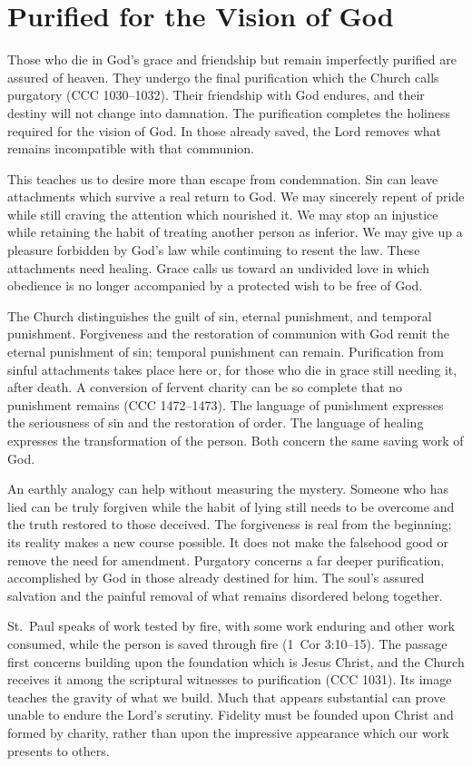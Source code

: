 \section{Purified for the Vision of God}

Those who die in God's grace and friendship but remain imperfectly purified are assured of heaven. They undergo the final purification which the Church calls purgatory (CCC 1030--1032). Their friendship with God endures, and their destiny will not change into damnation. The purification completes the holiness required for the vision of God. In those already saved, the Lord removes what remains incompatible with that communion.

This teaches us to desire more than escape from condemnation. Sin can leave attachments which survive a real return to God. We may sincerely repent of pride while still craving the attention which nourished it. We may stop an injustice while retaining the habit of treating another person as inferior. We may give up a pleasure forbidden by God's law while continuing to resent the law. These attachments need healing. Grace calls us toward an undivided love in which obedience is no longer accompanied by a protected wish to be free of God.

The Church distinguishes the guilt of sin, eternal punishment, and temporal punishment. Forgiveness and the restoration of communion with God remit the eternal punishment of sin; temporal punishment can remain. Purification from sinful attachments takes place here or, for those who die in grace still needing it, after death. A conversion of fervent charity can be so complete that no punishment remains (CCC 1472--1473). The language of punishment expresses the seriousness of sin and the restoration of order. The language of healing expresses the transformation of the person. Both concern the same saving work of God.

An earthly analogy can help without measuring the mystery. Someone who has lied can be truly forgiven while the habit of lying still needs to be overcome and the truth restored to those deceived. The forgiveness is real from the beginning; its reality makes a new course possible. It does not make the falsehood good or remove the need for amendment. Purgatory concerns a far deeper purification, accomplished by God in those already destined for him. The soul's assured salvation and the painful removal of what remains disordered belong together.

St.~Paul speaks of work tested by fire, with some work enduring and other work consumed, while the person is saved through fire (1~Cor 3:10--15). The passage first concerns building upon the foundation which is Jesus Christ, and the Church receives it among the scriptural witnesses to purification (CCC 1031). Its image teaches the gravity of what we build. Much that appears substantial can prove unable to endure the Lord's scrutiny. Fidelity must be founded upon Christ and formed by charity, rather than upon the impressive appearance which our work presents to others.

